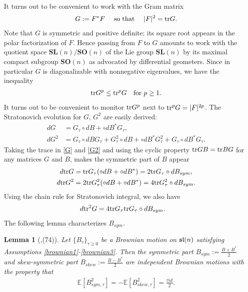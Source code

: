 \documentclass[english, letterpaper,12pt,reqno]{amsart}
\newtheorem{lemma}[theorem]{Lemma}
\theoremstyle{remark}
\theoremstyle{plain}
\newcommand{\1}{\mathbf{1}}
\def\bbE{\mathbb E}
\def\tr{{\rm tr}}
\begin{document}
\noindent
It turns out to be convenient to work with the Gram matrix
%
\begin{align}
    \label{:G} G:=F^*F \quad \text{ so that } \quad |F|^2=\tr G.
\end{align}
%
Note that $G$ is symmetric and positive definite; its square root appears in the polar factorization of $F$. Hence passing from $F$ to $G$ amounts to work with the quotient space $\textbf{SL}(n)/\textbf{SO}(n)$ of the Lie group $\textbf{SL}(n)$ by its maximal compact subgroup $\textbf{SO}(n)$ as advocated by differential geometers. Since in particular $G$ is diagonalizable with nonnegative eigenvalues, we have the inequality %
%
\begin{align}\label{convexity}
    \tr G^p \leq \tr ^pG \quad \text{for } p\geq 1.
\end{align}
%
It turns out to be convenient to monitor $\tr G^p$ next to $\tr^pG=|F|^{2p}$. The Stratonovich evolution for $G$, $G^2$ are easily derived:
%
\begin{align}
    dG&=G_\tau \circ dB+\circ dB^* G_\tau, \label{G} \\
    dG^2&=G_\tau\circ dB G_\tau+G^2_\tau \circ dB+\circ dB^* G^2_\tau+G_\tau\circ dB^* G_\tau.\label{G2}
\end{align}
%
Taking the trace in \eqref{G} and \eqref{G2} and using the cyclic property $\tr GB=\tr BG$ for any matrices $G$ and $B$, makes the symmetric part of $B$ appear
%
 \begin{align}
    d\tr G &=\tr G_\tau (\circ dB+\circ dB^*) =2\tr G_\tau \circ dB_{sym}, \label{trgstr} \\
    d\tr G^2&=2\tr G^2_\tau (\circ dB+\circ dB^*) =4\tr G^2_\tau\circ dB_{sym}. \label{trG2str} 
\end{align}
%
Using the chain rule for Stratonovich integral, we also have \begin{align}
    d\tr^2 G&= 4\tr G_\tau \tr G_\tau\circ dB_{sym}.\label{tr2Gstr}
\end{align}
%
\noindent
The following lemma characterizes $B_{sym}$.
\begin{lemma}[\cite{MOW25},(74)]\label{lem:b}
   Let $\{B_\tau\}_{\tau\geq 0}$ be a Brownian motion on $\frak{sl}(n)$ satisfying Assumptions \ref{brownian1}-\ref{brownian3}. Then the symmetric part $B_{sym}:=\frac{B+B^*}{2}$ and skew-symmetric part $B_{skew}:=\frac{B-B^*}{2}$ are independent Brownian motions with the property that 
   \begin{align}
    \bbE[B_{sym,\tau}^2]= -\bbE[B_{skew,\tau}^2]=\frac{\tau id}{2}.\label{Bsymvar}
\end{align}
%
\end{lemma}
\end{document}
